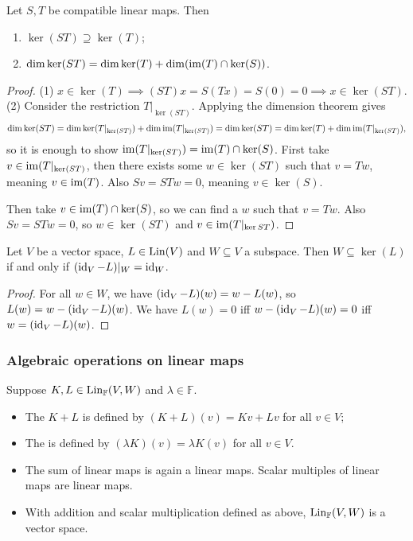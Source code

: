 \begin{proposition} \label{kernelCompositionLinearMaps}
Let $S,T$ be compatible linear maps. Then
\begin{enumerate}
\item $\ker(ST)\supseteq \ker(T)$;
\item $\dim\ker(ST) = \dim\ker(T) + \dim(\operatorname{im}(T)\cap\ker(S))$.
\end{enumerate}
\end{proposition}
\begin{proof}
(1) $x\in\ker(T) \implies (ST)x = S(Tx) = S(0) = 0 \implies x\in\ker(ST)$.
(2) Consider the restriction $T|_{\ker(ST)}$. Applying the dimension theorem gives
\[ \dim\ker(ST) = \dim\ker(T|_{\ker(ST)}) + \dim\operatorname{im}(T|_{\ker(ST)}) = \dim\ker(ST) = \dim\ker(T) + \dim\operatorname{im}(T|_{\ker(ST)}) , \]
so it is enough to show $\operatorname{im}(T|_{\ker(ST)}) = \operatorname{im}(T)\cap\ker(S)$. First take $v\in\operatorname{im}(T|_{\ker(ST)}$, then there exists some $w\in\ker(ST)$ such that $v=Tw$, meaning $v\in\operatorname{im}(T)$. Also $Sv = STw = 0$, meaning $v\in\ker(S)$.

Then take $v\in\operatorname{im}(T)\cap\ker(S)$, so we can find a $w$ such that $v = Tw$. Also $Sv = STw = 0$, so $w\in\ker(ST)$ and $v\in\operatorname{im}(T|_{\ker{ST}})$.
\end{proof}

\begin{lemma} \label{complementMapIdentityLemma}
Let $V$ be a vector space, $L\in \operatorname{Lin}(V)$ and $W\subseteq V$ a subspace. Then $W \subseteq \ker(L)$ \textup{if and only if} $(\operatorname{id}_V - L)|_W = \operatorname{id}_W$.
\end{lemma}
\begin{proof}
For all $w\in W$, we have $(\operatorname{id}_V - L)(w) = w - L(w)$, so $L(w) = w - (\operatorname{id}_V - L)(w)$. We have $L(w) = 0$ iff $w - (\operatorname{id}_V - L)(w) = 0$ iff $w = (\operatorname{id}_V - L)(w)$.
\end{proof}

\subsubsection{Algebraic operations on linear maps}
\begin{definition}
Suppose $K,L \in \operatorname{Lin}_{\mathbb{F}}(V,W)$ and $\lambda \in \mathbb{F}$.
\begin{itemize}
\item The  $K+L$ is defined by $(K+L)(v) = Kv+Lv$ for all $v\in V$;
\item The  is defined by $(\lambda K)(v) = \lambda K(v)$ for all $v\in V$.
\end{itemize}
\end{definition}
\begin{proposition} \label{linearMapsVectorSpace}
\begin{itemize}
\item The sum of linear maps is again a linear maps. Scalar multiples of linear maps are linear maps.
\item With addition and scalar multiplication defined as above, $\operatorname{Lin}_\mathbb{F}(V,W)$ is a vector space.
\end{itemize}
\end{proposition}

